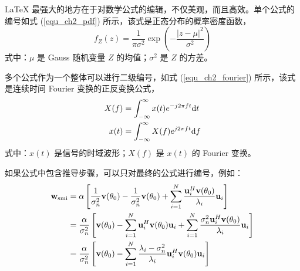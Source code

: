 
\LaTeX{} 最强大的地方在于对数学公式的编辑，不仅美观，而且高效。单个公式的编号如式 (\ref{equ_ch2_pdf}) 所示，该式是正态分布的概率密度函数，
\begin{equation} \label{equ_ch2_pdf}
	f_Z(z) = \frac{1}{\pi\sigma^2} \exp\left(-\frac{|z-\mu|^2}{\sigma^2}\right)
\end{equation}
式中：$\mu$ 是 Gauss 随机变量 $Z$ 的均值；$\sigma^2$ 是 $Z$ 的方差。


多个公式作为一个整体可以进行二级编号，如式 (\ref{equ_ch2_fourier}) 所示，该式是连续时间 Fourier 变换的正反变换公式，
\begin{subequations} \label{equ_ch2_fourier}
	\begin{align}
		X(f) &= \int_{-\infty}^{\infty}x(t)e^{-j2\pi f t}\mathrm{d} t \\
		x(t) &= \int_{-\infty}^{\infty}X(f)e^{j2\pi f t}\mathrm{d} f
	\end{align}
\end{subequations}
式中：$x(t)$ 是信号的时域波形；$X(f)$ 是 $x(t)$ 的 Fourier 变换。

如果公式中包含推导步骤，可以只对最终的公式进行编号，例如：
\begin{align}
	\mathbf{w}_{\mathrm{smi}} &= \alpha \left[\frac{1}{\sigma_n^2}\mathbf{v}(\theta_0) - \frac{1}{\sigma_n^2}\mathbf{v}(\theta_0) + \sum_{i=1}^{N} \frac{\mathbf{u}_i^H\mathbf{v}(\theta_0)}{\lambda_i} \mathbf{u}_i\right] \nonumber \\
	&= \frac{\alpha}{\sigma_n^2} \left[\mathbf{v}(\theta_0) - \sum_{i=1}^{N}\mathbf{u}_i^H\mathbf{v}(\theta_0)\mathbf{u}_i +  \sum_{i=1}^{N}\frac{\sigma_n^2\mathbf{u}_i^H\mathbf{v}(\theta_0)}{\lambda_i} \mathbf{u}_i \right] \nonumber \\
	&= \frac{\alpha}{\sigma_n^2} \left[\mathbf{v}(\theta_0) - \sum_{i=1}^{N} \frac{\lambda_i-\sigma_n^2}{\lambda_i} \mathbf{u}_i^H\mathbf{v}(\theta_0)\mathbf{u}_i \right]
\end{align}
